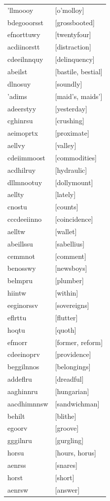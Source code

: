 \documentclass{article}
\begin{document}
\begin{tabular}{ll}
'llmoooy & [o'molloy] \\
bdegooorsst & [grossbooted] \\
efnorttuwy & [twentyfour] \\
acdiinorstt & [distraction] \\
cdeeilnnquy & [delinquency] \\
abeilst & [bastile, bestial] \\
dlnosuy & [soundly] \\
'adims & [maid's, maids'] \\
adeerstyy & [yesterday] \\
cghinrsu & [crushing] \\
aeimoprtx & [proximate] \\
aellvy & [valley] \\
cdeiimmoost & [commodities] \\
acdhilruy & [hydraulic] \\
dllmnootuy & [dollymount] \\
aellty & [lately] \\
cnostu & [counts] \\
cccdeeiinno & [coincidence] \\
aelltw & [wallet] \\
abeillssu & [sabellius] \\
cemmnot & [comment] \\
benosswy & [newsboys] \\
belmpru & [plumber] \\
hiintw & [within] \\
eeginorssv & [sovereigns] \\
eflrttu & [flutter] \\
hoqtu & [quoth] \\
efmorr & [former, reform] \\
cdeeinoprv & [providence] \\
beggilnnos & [belongings] \\
addeflru & [dreadful] \\
aaghinnru & [hungarian] \\
aacdhimnnsw & [sandwichman] \\
behilt & [blithe] \\
egoorv & [groove] \\
gggilnru & [gurgling] \\
horsu & [hours, horus] \\
aenrss & [snares] \\
horst & [short] \\
aenrsw & [answer] \\

\end{tabular}
\end{document}
